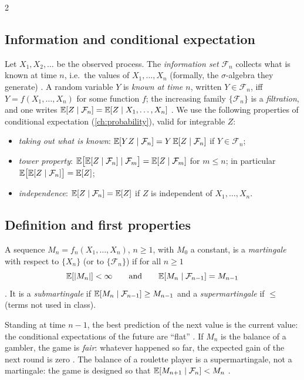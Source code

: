 \begin{paracol}{2}
\subsection{Information and conditional expectation}
Let $X_1,X_2,\dots$ be the observed process. The \emph{information set} $\mathcal F_n$ collects what is known at
time $n$, i.e.\ the values of $X_1,\dots,X_n$ (formally, the $\sigma$-algebra they generate) .
A random variable $Y$ is \emph{known at time $n$}, written $Y\in\mathcal F_n$, iff $Y=f(X_1,\dots,X_n)$ for
some function $f$; the increasing family $\{\mathcal F_n\}$ is a \emph{filtration}, and one writes
$\mathbb{E}[Z\mid\mathcal F_n]=\mathbb{E}[Z\mid X_1,\dots,X_n]$ . We use the following properties of
conditional expectation (\cref{ch:probability}), valid for integrable $Z$:
\begin{itemize}
  \item \emph{taking out what is known}: $\mathbb{E}[YZ\mid\mathcal F_n]=Y\,\mathbb{E}[Z\mid\mathcal F_n]$ if $Y\in\mathcal F_n$;
  \item \emph{tower property}: $\mathbb{E}\bigl[\mathbb{E}[Z\mid\mathcal F_n]\mid\mathcal F_m\bigr]=\mathbb{E}[Z\mid\mathcal F_m]$ for
        $m\le n$; in particular $\mathbb{E}\bigl[\mathbb{E}[Z\mid\mathcal F_n]\bigr]=\mathbb{E}[Z]$;
  \item \emph{independence}: $\mathbb{E}[Z\mid\mathcal F_n]=\mathbb{E}[Z]$ if $Z$ is independent of $X_1,\dots,X_n$.
\end{itemize}

\subsection{Definition and first properties}
\begin{definition}[Martingale]\label{ch04:def-mart}
A sequence $M_n=f_n(X_1,\dots,X_n)$, $n\ge1$, with $M_0$ a constant, is a \emph{martingale} with respect
to $\{X_n\}$ (or to $\{\mathcal F_n\}$) if for all $n\ge1$
\begin{equation}\label{ch04:eq-mart}
  \mathbb{E}[|M_n|]<\infty\qquad\text{and}\qquad \mathbb{E}[M_n\mid\mathcal F_{n-1}]=M_{n-1}
\end{equation}
. It is a \emph{submartingale} if $\mathbb{E}[M_n\mid\mathcal F_{n-1}]\ge M_{n-1}$ and a
\emph{supermartingale} if $\le$ (terms not used in class).
\end{definition}
Standing at time $n-1$, the best prediction of the next value is the current value: the conditional
expectations of the future are ``flat'' . If $M_n$ is the balance of a gambler, the game is
\emph{fair}: whatever happened so far, the expected gain of the next round is zero . The
balance of a roulette player is a supermartingale, not a martingale: the game is designed so that
$\mathbb{E}[M_{n+1}\mid\mathcal F_n]<M_n$ .


\end{paracol}
